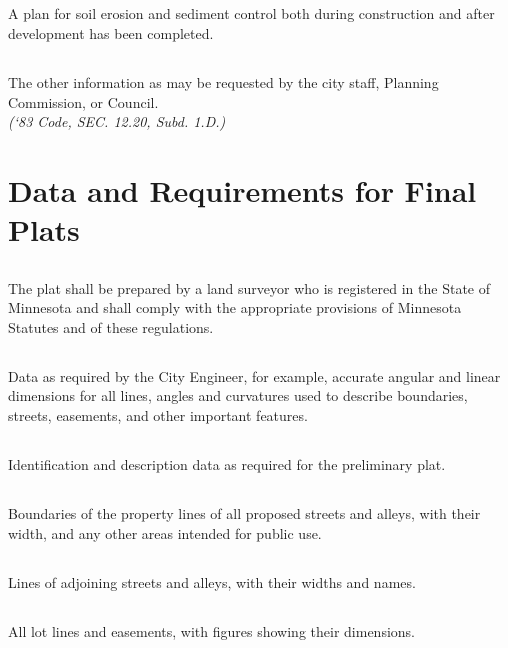 \subsection{}
A plan for soil erosion and sediment control both during construction and after development has been completed.
\subsection{}
The other information as may be requested by the city staff, Planning Commission, or Council.\\
\emph{(‘83 Code, SEC. 12.20, Subd. 1.D.)}
\section{Data and Requirements for Final Plats}
\subsection{}
The plat shall be prepared by a land surveyor who is registered in the State of Minnesota and shall comply with the appropriate provisions of Minnesota Statutes and of these regulations.
\subsection{}
Data as required by the City Engineer, for example, accurate angular and linear dimensions for all lines, angles and curvatures used to describe boundaries, streets, easements, and other important features.
\subsection{}
Identification and description data as required for the preliminary plat.
\subsection{}
Boundaries of the property lines of all proposed streets and alleys, with their width, and any other areas intended for public use.
\subsection{}
Lines of adjoining streets and alleys, with their widths and names.
\subsection{}
All lot lines and easements, with figures showing their dimensions.
